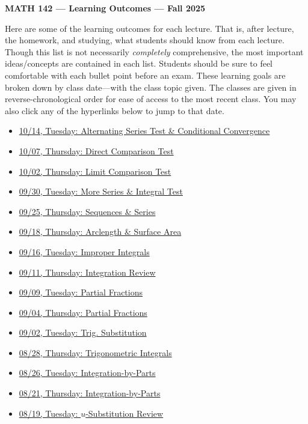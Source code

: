 \documentclass[11pt,letterpaper]{article}
\begin{document}
\begin{center} {\bfseries \LARGE MATH 142 --- Learning Outcomes --- Fall 2025} \end{center}

Here are some of the learning outcomes for each lecture. That is, after lecture, the homework, and studying, what students should know from each lecture. Though this list is not necessarily \textit{completely} comprehensive, the most important ideas/concepts are contained in each list. Students should be sure to feel comfortable with each bullet point before an exam. These learning goals are broken down by class date---with the class topic given. The classes are given in reverse-chronological order for ease of access to the most recent class. You may also click any of the hyperlinks below to jump to that date. 

\begin{itemize}
\item \hyperref[10-14]{10/14, Tuesday: Alternating Series Test \& Conditional Convergence}
\item \hyperref[10-07]{10/07, Thursday: Direct Comparison Test}
\item \hyperref[10-02]{10/02, Thursday: Limit Comparison Test}
\item \hyperref[09-30]{09/30, Tuesday: More Series \& Integral Test}
\item \hyperref[09-25]{09/25, Thursday: Sequences \& Series}
\item \hyperref[09-18]{09/18, Thursday: Arclength \& Surface Area}
\item \hyperref[09-16]{09/16, Tuesday: Improper Integrals}
\item \hyperref[09-11]{09/11, Thursday: Integration Review}
\item \hyperref[09-09]{09/09, Tuesday: Partial Fractions}
\item \hyperref[09-04]{09/04, Thursday: Partial Fractions}
\item \hyperref[09-02]{09/02, Tuesday: Trig. Substitution}
\item \hyperref[08-28]{08/28, Thursday: Trigonometric Integrals}
\item \hyperref[08-26]{08/26, Tuesday: Integration-by-Parts}
\item \hyperref[08-21]{08/21, Thursday: Integration-by-Parts}
\item \hyperref[08-19]{08/19, Tuesday: $u$-Substitution Review}
\end{itemize}

\newpage
\end{document}
